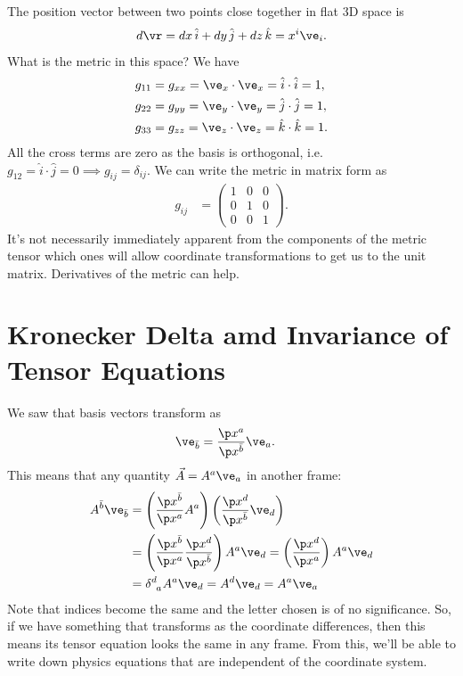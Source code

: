 \documentclass[a4paper, 11pt, normalem]{report}
\begin{document}
\begin{example}
The position vector between two points close together in flat 3D space is
\begin{align}
    d\vr = dx\,\hat{i} + dy\,\hat{j} + dz\,\hat{k} = x^i\ve_i.
\end{align}
What is the metric in this space?
We have
\begin{align}
    g_{11} &= g_{xx} = \ve_x\cdot\ve_x = \hat{i}\cdot\hat{i}=1,\\
    g_{22} &= g_{yy} = \ve_y\cdot\ve_y = \hat{j}\cdot\hat{j}=1,\\
    g_{33} &= g_{zz} = \ve_z\cdot\ve_z = \hat{k}\cdot\hat{k}=1.
\end{align}
All the cross terms are zero as the basis is orthogonal, i.e. $g_{12}=\hat{i}\cdot\hat{j}=0\implies g_{ij}=\delta_{ij}$.
We can write the metric in matrix form as
\begin{align}
    g_{ij} &= \begin{pmatrix} 1 & 0 & 0 \\ 0 & 1 & 0 \\ 0 & 0 & 1 \end{pmatrix}.
\end{align}
It's not necessarily immediately apparent from the components of the metric tensor which ones will allow coordinate transformations to get us to the unit matrix. 
Derivatives of the metric can help.
\end{example}

\section{Kronecker Delta amd Invariance of Tensor Equations}
We saw that basis vectors transform as 
\begin{align}
    \ve_{\bar{b}} &= \frac{\p x^a}{\p x^{\bar{b}}}\ve_a.
\end{align}
This means that any quantity $\vec{A} = A^a\ve_a$ in another frame:
\begin{align}
    \begin{split}
        A^{\bar{b}}\ve_{\bar{b}} &= \left(\frac{\p x^{\bar{b}}}{\p x^a}A^a\right)\left(\frac{\p x^{d}}{\p x^{\bar{b}}}\ve_d\right) \\
                                 &= \left(\frac{\p x^{\bar{b}}}{\p x^a}\frac{\p x^{d}}{\p x^{\bar{b}}}\right)A^a\ve_d = \left(\frac{\p x^{d}}{\p x^a}\right)A^a\ve_d \\
                                 &= \tensor{\delta}{^d_a}A^a\ve_d = A^d\ve_d = A^a\ve_a
    \end{split}
\end{align}
Note that indices become the same and the letter chosen is of no significance. 
So, if we have something that transforms as the coordinate differences, then this means its tensor equation looks the same in any frame. 
From this, we'll be able to write down physics equations that are independent of the coordinate system.
\end{document}

